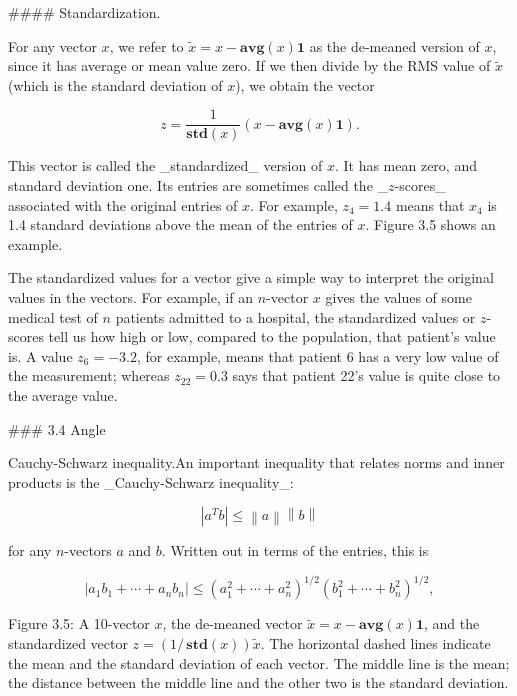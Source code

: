 

#### Standardization.

For any vector \(x\), we refer to \(\tilde{x}=x-\mathbf{avg}(x)\mathbf{1}\) as the de-meaned version of \(x\), since it has average or mean value zero. If we then divide by the RMS value of \(\tilde{x}\) (which is the standard deviation of \(x\)), we obtain the vector

\[z=\frac{1}{\mathbf{std}(x)}(x-\mathbf{avg}(x)\mathbf{1}).\]

This vector is called the _standardized_ version of \(x\). It has mean zero, and standard deviation one. Its entries are sometimes called the _\(z\)-scores_ associated with the original entries of \(x\). For example, \(z_{4}=1.4\) means that \(x_{4}\) is 1.4 standard deviations above the mean of the entries of \(x\). Figure 3.5 shows an example.

The standardized values for a vector give a simple way to interpret the original values in the vectors. For example, if an \(n\)-vector \(x\) gives the values of some medical test of \(n\) patients admitted to a hospital, the standardized values or \(z\)-scores tell us how high or low, compared to the population, that patient's value is. A value \(z_{6}=-3.2\), for example, means that patient 6 has a very low value of the measurement; whereas \(z_{22}=0.3\) says that patient 22's value is quite close to the average value.

### 3.4 Angle

Cauchy-Schwarz inequality.An important inequality that relates norms and inner products is the _Cauchy-Schwarz inequality_:

\[|a^{T}b|\leq\left\|a\right\|\left\|b\right\|\]

for any \(n\)-vectors \(a\) and \(b\). Written out in terms of the entries, this is

\[|a_{1}b_{1}+\cdots+a_{n}b_{n}|\leq\left(a_{1}^{2}+\cdots+a_{n}^{2}\right)^{1/ 2}\left(b_{1}^{2}+\cdots+b_{n}^{2}\right)^{1/2},\]

Figure 3.5: A 10-vector \(x\), the de-meaned vector \(\tilde{x}=x-\mathbf{avg}(x)\mathbf{1}\), and the standardized vector \(z=(1/\,\mathbf{std}(x))\tilde{x}\). The horizontal dashed lines indicate the mean and the standard deviation of each vector. The middle line is the mean; the distance between the middle line and the other two is the standard deviation.

